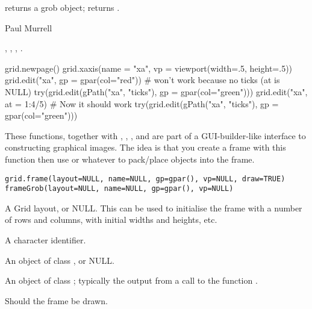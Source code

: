 %
\begin{Value}
 returns a grob object;   returns .
\end{Value}
%
\begin{Author}\relax
Paul Murrell
\end{Author}
%
\begin{SeeAlso}\relax
{}, ,
, .
\end{SeeAlso}
%
\begin{Examples}
\begin{ExampleCode}
grid.newpage()
grid.xaxis(name = "xa", vp = viewport(width=.5, height=.5))
grid.edit("xa", gp = gpar(col="red"))
# won't work because no ticks (at is NULL)
try(grid.edit(gPath("xa", "ticks"), gp = gpar(col="green")))
grid.edit("xa", at = 1:4/5)
# Now it should work
try(grid.edit(gPath("xa", "ticks"), gp = gpar(col="green")))
\end{ExampleCode}
\end{Examples}
%
\begin{Description}\relax
These functions, together with ,
, , and  are part of a
GUI-builder-like interface to constructing graphical images.
The idea is that you create a frame with this function then
use  or whatever to pack/place objects into the frame.
\end{Description}
%
\begin{Usage}
\begin{verbatim}
grid.frame(layout=NULL, name=NULL, gp=gpar(), vp=NULL, draw=TRUE)
frameGrob(layout=NULL, name=NULL, gp=gpar(), vp=NULL)
\end{verbatim}
\end{Usage}
%
\begin{Arguments}
\begin{ldescription}
\item[\code{layout}]  A Grid layout, or NULL. This can be used to initialise
the frame with a number of rows and columns, with initial widths
and heights, etc. 
\item[\code{name}]  A character identifier. 
\item[\code{vp}]  An object of class , or NULL. 
\item[\code{gp}]  An object of class ;  typically the output from
a call to the function .
\item[\code{draw}]  Should the frame be drawn.  
\end{ldescription}
\end{Arguments}
